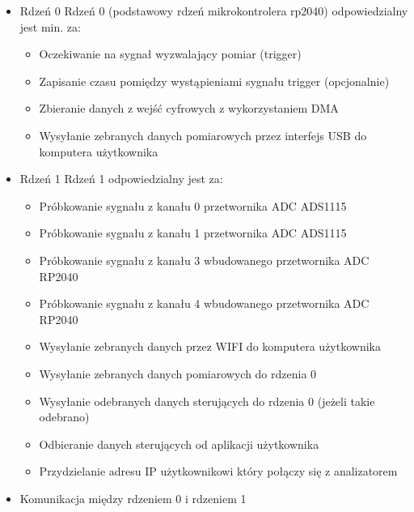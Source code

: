\begin{itemize}
    \item Rdzeń 0
    Rdzeń 0 (podstawowy rdzeń mikrokontrolera rp2040) odpowiedzialny jest min. za:
    \begin{itemize}
        \item Oczekiwanie na sygnał wyzwalający pomiar (trigger)
        \item Zapisanie czasu pomiędzy wystąpieniami sygnału trigger (opcjonalnie) 
        \item Zbieranie danych z wejść cyfrowych z wykorzystaniem DMA
        \item Wysyłanie zebranych danych pomiarowych przez interfejs USB do komputera użytkownika
    \end{itemize}

    \item Rdzeń 1
    Rdzeń 1 odpowiedzialny jest za:
    \begin{itemize}
        \item Próbkowanie sygnału z kanału 0 przetwornika ADC ADS1115
        \item Próbkowanie sygnału z kanału 1 przetwornika ADC ADS1115
        \item Próbkowanie sygnału z kanału 3 wbudowanego przetwornika ADC RP2040
        \item Próbkowanie sygnału z kanału 4 wbudowanego przetwornika ADC RP2040
        \item Wysyłanie zebranych danych przez WIFI do komputera użytkownika
        \item Wysyłanie zebranych danych pomiarowych do rdzenia 0
        \item Wysyłanie odebranych danych sterujących do rdzenia 0 (jeżeli takie odebrano)
        \item Odbieranie danych sterujących od aplikacji użytkownika
        \item Przydzielanie adresu IP użytkownikowi który połączy się z analizatorem 
    \end{itemize}

    \item Komunikacja między rdzeniem 0 i rdzeniem 1
    \begin{figure}[h!]
    \centering
    \begin{tikzpicture}[
        corebox/.style={
            rectangle,
            draw=blue!35!black,
            line width=1mm,
            fill=blue!10,
            rounded corners,
            minimum width=7cm,
            minimum height=10cm,
            align=left,
            text width=6cm,
            font=\bfseries
        },
        arrow/.style={
            <->,
            ultra thick,
            draw=blue!70!black
        }
    ]


\end{tikzpicture}
\end{figure}
\end{itemize}
